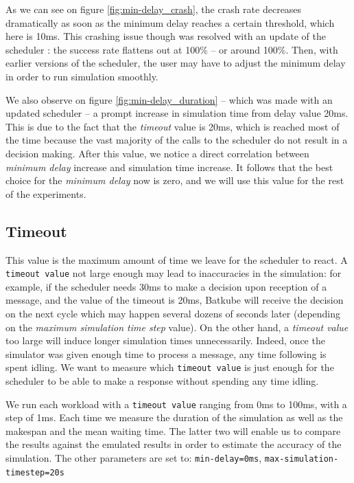 As we can see on figure \ref{fig:min-delay_crash}, the crash rate decreases
dramatically as soon as the minimum delay reaches a certain threshold, which
here is 10ms.  This crashing issue though was resolved with an update of the
scheduler : the success rate flattens out at 100\% -- or around 100\%. Then,
with earlier versions of the scheduler, the user may have to adjust the minimum
delay in order to run simulation smoothly. 

We also observe on figure \ref{fig:min-delay_duration} -- which was made with
an updated scheduler -- a prompt increase in simulation time from delay value
20ms. This is due to the fact that the \textit{timeout} value is 20ms, which is
reached most of the time because the vast majority of the calls to the
scheduler do not result in a decision making. After this value, we notice a
direct correlation between \textit{minimum delay} increase and simulation time
increase. It follows that the best choice for the \textit{minimum delay} now is
zero, and we will use this value for the rest of the experiments.


\subsection{Timeout}

This value is the maximum amount of time we leave for the scheduler to react. A
\texttt{timeout value} not large enough may lead to inaccuracies in the
simulation: for example, if the scheduler needs 30ms to make a decision upon
reception of a message, and the value of the timeout is 20ms, Batkube will
receive the decision on the next cycle which may happen several dozens of
seconds later (depending on the \textit{maximum simulation time step} value).
On the other hand, a \textit{timeout value} too large will induce longer
simulation times unnecessarily. Indeed, once the simulator was given enough
time to process a message, any time following is spent idling. We want to
measure which \texttt{timeout value} is just enough for the scheduler to be
able to make a response without spending any time idling.

We run each workload with a \texttt{timeout value} ranging from 0ms to 100ms,
with a step of 1ms. Each time we measure the duration of the simulation as well
as the makespan and the mean waiting time. The latter two will enable us to
compare the results against the emulated results in order to estimate the
accuracy of the simulation. The other parameters are set to:
\texttt{min-delay=0ms}, \texttt{max-simulation-timestep=20s}

